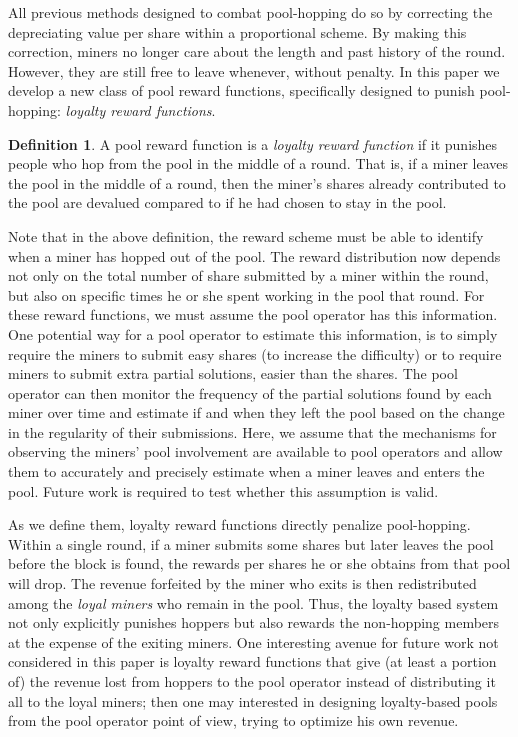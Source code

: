 \documentclass{article}
\theoremstyle{plain}
\theoremstyle{definition}
\newtheorem{definition}{Definition}[section]
\begin{document}
All previous methods designed to combat pool-hopping do so by correcting the depreciating value per share within a proportional scheme. By making this correction, miners no longer care about the length and past history of the round. However, they are still free to leave whenever, without penalty. In this paper we develop a new class of pool reward functions, specifically designed to punish pool-hopping: \emph{loyalty reward functions}.
\begin{definition}
A pool reward function is a \emph{loyalty reward function} if it punishes people who hop from the pool in the middle of a round. That is, if a miner leaves the pool in the middle of a round, then the miner's shares already contributed to the pool are devalued compared to if he had chosen to stay in the pool. 
\end{definition}

Note that in the above definition, the reward scheme must be able to identify when a miner has hopped out of the pool. The reward distribution now depends not only on the total number of share submitted by a miner within the round, but also on specific times he or she spent working in the pool that round. For these reward functions, we must assume the pool operator has this information. One potential way for a pool operator to estimate this information, is to simply require the miners to submit easy shares (to increase the difficulty) or to require miners to submit extra partial solutions, easier than the shares. The pool operator can then monitor the frequency of the partial solutions found by each miner over time and estimate if and when they left the pool based on the change in the regularity of their submissions. Here, we assume that the mechanisms for observing the miners' pool involvement are available to pool operators and allow them to accurately and precisely estimate when a miner leaves and enters the pool.
Future work is required to test whether this assumption is valid.

As we define them, loyalty reward functions directly penalize pool-hopping. Within a single round, if a miner submits some shares but later leaves the pool before the block is found, 
the rewards per shares he or she obtains from that pool will drop. The revenue forfeited by the miner who exits is then redistributed among the \emph{loyal miners} who remain in the pool.  Thus, the loyalty based system not only explicitly punishes hoppers but also rewards the non-hopping members at the expense of the exiting miners. One interesting avenue for future work not considered in this paper is loyalty reward functions that give (at least a portion of) the revenue lost from hoppers to the pool operator instead of distributing it all to the loyal miners; then one may interested in designing loyalty-based pools from the pool operator point of view, trying to optimize his own revenue.
\end{document}
